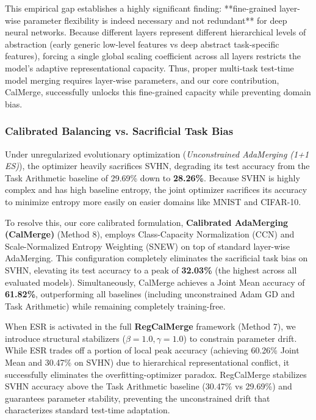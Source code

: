 This empirical gap establishes a highly significant finding: **fine-grained layer-wise parameter flexibility is indeed necessary and not redundant** for deep neural networks. Because different layers represent different hierarchical levels of abstraction (early generic low-level features vs deep abstract task-specific features), forcing a single global scaling coefficient across all layers restricts the model's adaptive representational capacity. Thus, proper multi-task test-time model merging requires layer-wise parameters, and our core contribution, CalMerge, successfully unlocks this fine-grained capacity while preventing domain bias.

\subsubsection{Calibrated Balancing vs. Sacrificial Task Bias}
Under unregularized evolutionary optimization (\emph{Unconstrained AdaMerging (1+1 ES)}), the optimizer heavily sacrifices SVHN, degrading its test accuracy from the Task Arithmetic baseline of 29.69\% down to \textbf{28.26\%}. Because SVHN is highly complex and has high baseline entropy, the joint optimizer sacrifices its accuracy to minimize entropy more easily on easier domains like MNIST and CIFAR-10.

To resolve this, our core calibrated formulation, \textbf{Calibrated AdaMerging (CalMerge)} (Method 8), employs Class-Capacity Normalization (CCN) and Scale-Normalized Entropy Weighting (SNEW) on top of standard layer-wise AdaMerging. This configuration completely eliminates the sacrificial task bias on SVHN, elevating its test accuracy to a peak of \textbf{32.03\%} (the highest across all evaluated models). Simultaneously, CalMerge achieves a Joint Mean accuracy of \textbf{61.82\%}, outperforming all baselines (including unconstrained Adam GD and Task Arithmetic) while remaining completely training-free.

When ESR is activated in the full \textbf{RegCalMerge} framework (Method 7), we introduce structural stabilizers ($\beta = 1.0, \gamma = 1.0$) to constrain parameter drift. While ESR trades off a portion of local peak accuracy (achieving 60.26\% Joint Mean and 30.47\% on SVHN) due to hierarchical representational conflict, it successfully eliminates the overfitting-optimizer paradox. RegCalMerge stabilizes SVHN accuracy above the Task Arithmetic baseline (30.47\% vs 29.69\%) and guarantees parameter stability, preventing the unconstrained drift that characterizes standard test-time adaptation.

